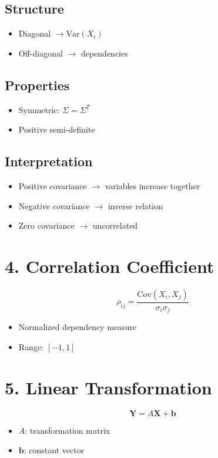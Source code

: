 \documentclass[12pt]{article}
\begin{document}
\subsection*{Structure}
\begin{itemize}
\item Diagonal $\rightarrow \text{Var}(X_i)$
\item Off-diagonal $\rightarrow$ dependencies
\end{itemize}

\subsection*{Properties}
\begin{itemize}
\item Symmetric: $\Sigma = \Sigma^T$
\item Positive semi-definite
\end{itemize}

\subsection*{Interpretation}
\begin{itemize}
\item Positive covariance $\rightarrow$ variables increase together
\item Negative covariance $\rightarrow$ inverse relation
\item Zero covariance $\rightarrow$ uncorrelated
\end{itemize}

\section*{4. Correlation Coefficient}

\[
\rho_{ij} = \frac{\text{Cov}(X_i, X_j)}{\sigma_i \sigma_j}
\]

\begin{itemize}
\item Normalized dependency measure
\item Range: $[-1,1]$
\end{itemize}

\section*{5. Linear Transformation}

\[
\mathbf{Y} = A\mathbf{X} + \mathbf{b}
\]

\begin{itemize}
\item $A$: transformation matrix
\item $\mathbf{b}$: constant vector
\end{itemize}
\end{document}

